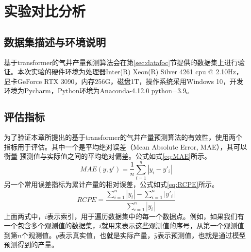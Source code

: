 \section{实验对比分析}
\subsection{数据集描述与环境说明}
基于transformer的气井产量预测算法会在第\ref{sec:datafoc}节提供的数据集上进行验证。本次实验的硬件环境为处理器Inter(R) Xeon(R) Silver 4261 cpu @ 2.10Hz，
显卡GeForce RTX 3090，内存256G，磁盘1T，操作系统采用Windows 10，开发环境为Pycharm，Python环境为Anaconda-4.12.0 python=3.9。
\subsection{评估指标}
为了验证本章所提出的基于transformer的气井产量预测算法的有效性，使用两个指标用于评估。其中一个是平均绝对误差（Mean Absolute Error, MAE），其可以衡量
预测值与实际值之间的平均绝对偏差。公式如式\eqref{eq:MAE}所示。
\begin{equation}
    MAE(y, y') = \frac{1}{n} \sum_{i=1}^{n} |y_i - y'_i|
    \label{eq:MAE}
\end{equation}
另一个常用误差指标为累计产量的相对误差，公式如式\eqref{eq:RCPE}所示。
\begin{equation}
    RCPE = \frac{\sum_{i=1}^{n} |y_i| - \sum_{i=1}^{n} |y'_i|}{\sum_{i=1}^{n} |y_i|}
    \label{eq:RCPE}
\end{equation}
上面两式中，$i$表示索引，用于遍历数据集中的每一个数据点。例如，如果我们有一个包含多个观测值的数据集，$i$就用来表示这些观测值的序号，从第一个观测值
到第$n$个观测值。$y$表示真实值，也就是实际产量，$\hat{y}$表示预测值，也就是通过模型预测得到的产量。
